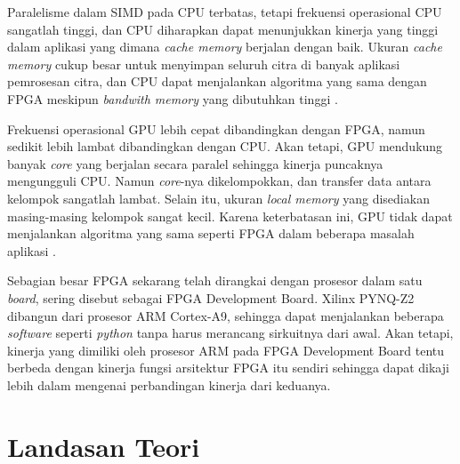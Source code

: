 
Paralelisme dalam SIMD pada CPU terbatas, tetapi frekuensi operasional CPU sangatlah tinggi, dan CPU diharapkan dapat menunjukkan kinerja yang tinggi dalam aplikasi yang dimana \textit{cache memory} berjalan dengan baik. Ukuran \textit{cache memory} cukup besar untuk menyimpan seluruh citra di banyak aplikasi pemrosesan citra, dan CPU dapat menjalankan algoritma yang sama dengan FPGA meskipun \textit{bandwith memory} yang dibutuhkan tinggi \cite{lb:asano}.

Frekuensi operasional GPU lebih cepat dibandingkan dengan FPGA, namun sedikit lebih lambat dibandingkan dengan CPU. Akan tetapi, GPU mendukung banyak \textit{core} yang berjalan secara paralel sehingga kinerja puncaknya mengungguli CPU. Namun \textit{core}-nya dikelompokkan, dan transfer data antara kelompok sangatlah lambat. Selain itu, ukuran \textit{local memory} yang disediakan masing-masing kelompok sangat kecil. Karena keterbatasan ini, GPU tidak dapat menjalankan algoritma yang sama seperti FPGA dalam beberapa masalah aplikasi \cite{lb:asano}.

Sebagian besar FPGA sekarang telah dirangkai dengan prosesor dalam satu \textit{board}, sering disebut sebagai FPGA Development Board. Xilinx PYNQ-Z2 dibangun dari prosesor ARM Cortex-A9, sehingga dapat menjalankan beberapa \textit{software} seperti \textit{python} tanpa harus merancang sirkuitnya dari awal. Akan tetapi, kinerja yang dimiliki oleh prosesor ARM pada FPGA Development Board tentu berbeda dengan kinerja fungsi arsitektur FPGA itu sendiri sehingga dapat dikaji lebih dalam mengenai perbandingan kinerja dari keduanya.


\section{Landasan Teori}


